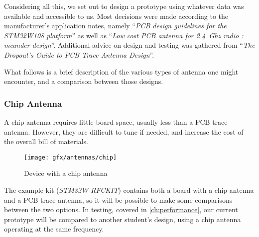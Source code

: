 Considering all this, we set out to design a prototype using whatever data was
available and accessible to us. Most decisions were made according to the
manufacturer's application notes, namely ``\emph{PCB design guidelines for the
STM32W108 platform}''\citep{AN3206} as well as ``\emph{Low cost PCB antenna for
\SI{2.4}{Ghz} radio : meander design}''\citep{AN3359}. Additional advice on
design and testing was gathered from ``\emph{The Dropout's Guide to PCB Trace
Antenna Design}''\citep{DropoutGuide}. 

What follows is a brief description of the various types of antenna one might
encounter, and a comparison between those designs. 


\subsubsection{Chip Antenna}


A chip antenna requires little board space, usually less than a PCB trace
antenna. However, they are difficult to tune if needed, and increase the cost of
the overall bill of materials.

\begin{figure}[bth]
  \begin{center}
    \texttt{[image: gfx/antennas/chip]}
  \end{center}
  \caption{Device with a chip antenna}
  \label{fig:chip-antenna}
\end{figure}

The example kit (\emph{STM32W-RFCKIT}) contains both a board with a chip antenna
and a PCB trace antenna, so it will be possible to make some comparisons between
the two options. In testing, covered in \autoref{ch:performance}, our current
prototype will be compared to another student's design, using a chip antenna
operating at the same frequency.

